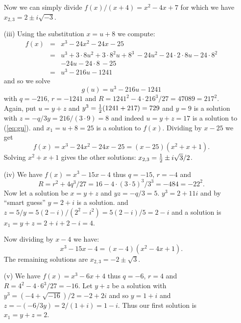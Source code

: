 \begin{myenumerate}
\begin{itemize}
   Now we can simply divide \(f(x)/(x+4)=x^2-4x+7\)
   for which we have \(x_{2,3}=2\pm i\sqrt{-3}\).

 \item[(iii)]
   Using the substitution \(x=u+8\) we compute:
   \begin{eqnarray*}
   f(x)
     & = & x^3 - 24x^2 - 24x - 25 \\
     & = & u^3 + 3\cdot 8u^2 +       3\cdot 8^2 u  + 8^3 \,
                      -24u^2 - 24\cdot 2\cdot 8 u  - 24\cdot 8^2 \\
     &   &                                  -24 u  - 24\cdot 8 \, -25 \\
     & = & u^3 - 216 u - 1241
   \end{eqnarray*}
   and so we solve
   \begin{equation} \label{eq:gu}
   g(u) = u^3 - 216u - 1241
   \end{equation}
    with \(q=-216\), \(r=-1241\) and
   \(R=1241^2 - 4 \cdot 216^3/27 =  47089 = 217^2\).
   Again, put \(u=y+z\) and \(y^3=\frac{1}{2}(1241+217)=729\) and \(y=9\)
   is a solution with \(z=-q/3y=216/(3\cdot 9)=8\)
   and indeed \(u=y+z=17\) is a solution to (\ref{eq:gu}).
   and \(x_1=u+8=25\) is a solution to \(f(x)\).
   Dividing by \(x-25\) we get
   \begin{equation*}
   f(x)= x^3 - 24x^2 - 24x - 25 = (x-25)(x^2+x+1).
   \end{equation*}
   Solving \(x^2+x+1\) gives the other solutions:
   \(x_{2,3} = \frac{1}{2} \pm i\sqrt{3}/2\).

 \item[(iv)]
   We have \(f(x) = x^3 - 15x - 4\) thus
        \(q=-15\), \(r=-4\) and
        \[R = r^2+4q^3/27 = 16-4\cdot (3\cdot5)^3/3^3 =
          -484 = -22^2.\]
   Now let a solution be \(x=y+z\) and \(yz=-q/3=5\).
   \(y^3=2+11i\) and by ``smart guess'' \(y=2+i\) is a solution.
   and \(z=5/y=5(2-i)/(2^2-i^2)=5(2-i)/5=2-i\)
   and a solution is \(x_1=y+z=2+i+2-i=4\).

   Now dividing by \(x-4\) we have:
   \begin{equation*}
   x^3 - 15x - 4 = (x-4)(x^2 -4x+1).
   \end{equation*}
   The remaining solutions are \(x_{2,3} = -2 \pm \sqrt{3}\).

 \item[(v)]
   We have \(f(x) = x^3 - 6x + 4\) thus
   \(q=-6\), \(r=4\) and
   \(R=4^2-4\cdot 6^3/27=-16\).
   Let \(y+z\) be a solution with \(y^3=(-4+\sqrt{-16})/2 = -2 + 2i\)
   and so \(y=1+i\) and \(z=-(-6/3y)=2/(1+i)=1-i\).
   Thus our first solution is \(x_1=y+z=2\).


\end{itemize}
\end{myenumerate}

